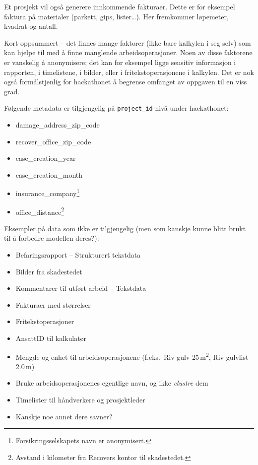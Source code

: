 \documentclass[a4paper]{article}
\begin{document}
Et prosjekt vil også generere innkommende fakturaer. Dette er for eksempel faktura på materialer (parkett, gips, lister\dots). Her fremkommer løpemeter, kvadrat og antall.

Kort oppsummert -- det finnes mange faktorer (ikke bare kalkylen i seg selv) som kan hjelpe til med å finne manglende arbeidsoperasjoner. Noen av disse faktorene er vanskelig å anonymisere; det kan for eksempel ligge sensitiv informasjon i rapporten, i timelistene, i bilder, eller i fritekstoperasjonene i kalkylen. Det er nok også formålstjenlig for hackathonet å begrense omfanget av oppgaven til en viss grad.

Følgende metadata er tilgjengelig på \texttt{project\_id}-nivå under hackathonet:
\begin{itemize}
\item damage\_address\_zip\_code
\item recover\_office\_zip\_code
\item case\_creation\_year
\item case\_creation\_month
\item insurance\_company\footnote{Forsikringsselskapets navn er anonymisert.}
\item office\_distance\footnote{Avstand i kilometer fra Recovers kontor til skadestedet.}
\end{itemize}

Eksempler på data som ikke er tilgjengelig (men som kanskje kunne blitt brukt til å forbedre modellen deres?):
\begin{itemize}
\item Befaringsrapport -- Strukturert tekstdata
\item Bilder fra skadestedet
\item Kommentarer til utført arbeid -- Tekstdata
\item Fakturaer med størrelser
\item Fritekstoperasjoner
\item AnsattID til kalkulatør
\item Mengde og enhet til arbeidsoperasjonene (f.eks.\ Riv gulv 25\,m\textsuperscript{2}, Riv gulvlist 2.0\,m)
\item Bruke arbeidsoperasjonenes egentlige navn, og ikke \emph{clustre} dem
\item Timelister til håndverkere og prosjektleder
\item Kanskje noe annet dere savner?
\end{itemize}
\end{document}
